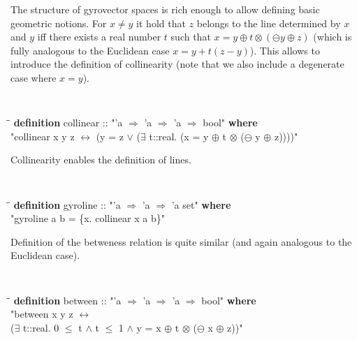 \documentclass[a4paper]{article}
\theoremstyle{definition}
\begin{document}
The structure of gyrovector spaces is rich enough to allow defining
basic geometric notions. For $x \neq y$ it hold that $z$ belongs to
the line determined by $x$ and $y$ iff there exists a real number $t$
such that $x = y \oplus t \otimes (\ominus y \oplus z)$ (which is
fully analogous to the Euclidean case $x = y + t (z - y)$). This
allows to introduce the definition of collinearity (note that we also
include a degenerate case where $x=y$).

\begin{small}
{\tt
\begin{tabbing}
\hspace{5mm}\=\hspace{5mm}\=\kill
{\bf definition} collinear :: "'a $\Rightarrow$ 'a $\Rightarrow$ 'a $\Rightarrow$ bool" {\bf where}\\
\>"collinear x y z $\longleftrightarrow$ (y = z $\vee$ ($\exists$ t::real. (x = y $\oplus$ t $\otimes$ ($\ominus$ y $\oplus$ z))))"
\end{tabbing}
}
\end{small}

Collinearity enables the definition of lines.

\begin{small}
{\tt
\begin{tabbing}
\hspace{5mm}\=\hspace{5mm}\=\kill
{\bf definition} gyroline :: "'a $\Rightarrow$ 'a $\Rightarrow$ 'a set" {\bf where}\\
\>  "gyroline a b = \{x. collinear x a b\}"
\end{tabbing}
}
\end{small}


Definition of the betweness relation is quite similar (and again
analogous to the Euclidean case).

\begin{small}
{\tt
\begin{tabbing}
\hspace{5mm}\=\hspace{5mm}\=\kill
{\bf definition} between :: "'a $\Rightarrow$ 'a $\Rightarrow$ 'a $\Rightarrow$ bool" {\bf where}\\
\>  "between x y z $\longleftrightarrow$\\
\>\>($\exists$ t::real. 0 $\leq$ t $\wedge$ t $\leq$ 1 $\wedge$ y = x $\oplus$ t $\otimes$ ($\ominus$ x $\oplus$ z))"
\end{tabbing}
}
\end{small}
\end{document}
